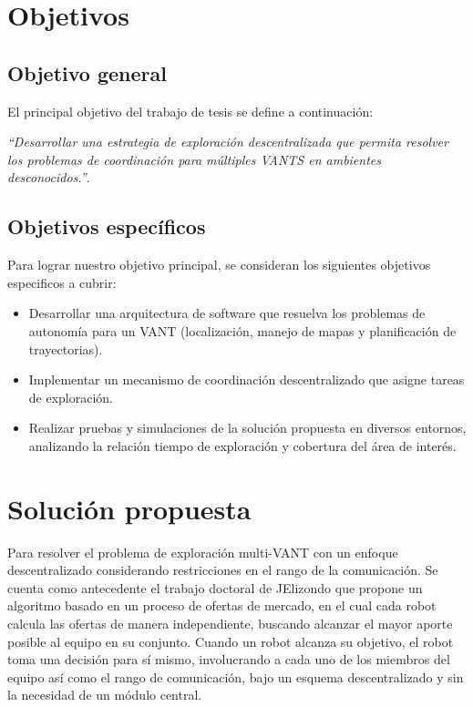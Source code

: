 \section{Objetivos}

\subsection*{Objetivo general}

El principal objetivo del trabajo de tesis se define a continuación:

\emph{``Desarrollar una estrategia de exploración descentralizada que permita resolver los problemas de coordinación para múltiples VANTS en ambientes desconocidos.''}.

\subsection*{Objetivos específicos}

Para lograr nuestro objetivo principal, se consideran los siguientes objetivos especificos a cubrir:

\begin{itemize}\setlength{\itemsep}{-1mm}
\item Desarrollar una arquitectura de software que resuelva los problemas de autonomía para un VANT (localización, manejo de mapas y planificación de trayectorias).
\item Implementar un mecanismo de coordinación descentralizado que asigne tareas de exploración.
\item Realizar pruebas y simulaciones de la solución propuesta en diversos entornos, analizando la relación tiempo de exploración y cobertura del área de interés.
\end{itemize}

\section{Solución propuesta}

Para resolver el problema de exploración multi-VANT con un enfoque descentralizado considerando restricciones en el rango de la comunicación. Se cuenta como antecedente el trabajo doctoral de JElizondo que propone un algoritmo basado en un proceso de ofertas de mercado, en el cual cada robot calcula las ofertas de manera independiente, buscando alcanzar el mayor aporte posible al equipo en su conjunto. Cuando un robot alcanza su objetivo, el robot toma una decisión para sí mismo, involucrando a cada uno de los miembros del equipo así como el rango de comunicación, bajo un esquema descentralizado y sin la necesidad de un módulo central.


